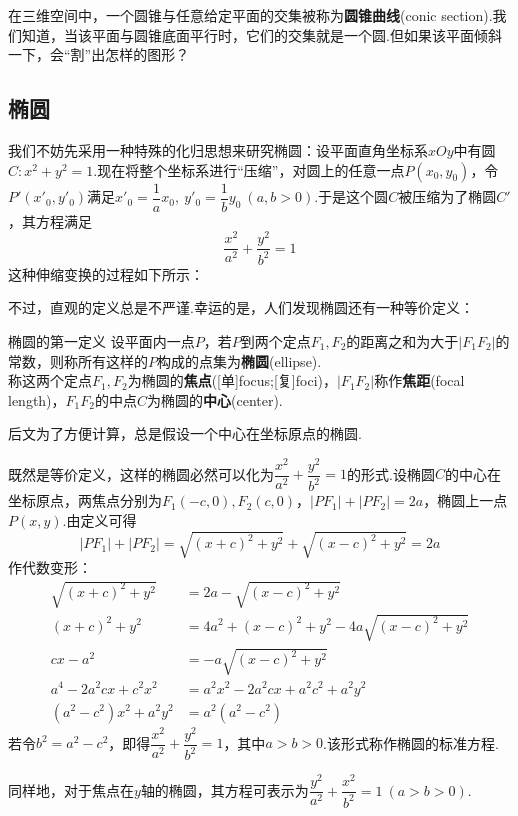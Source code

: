 \documentclass[lang=cn, zihao=5]{elegantbook}
\begin{document}
在三维空间中，一个圆锥与任意给定平面的交集被称为\textbf{圆锥曲线}(conic section).我们知道，当该平面与圆锥底面平行时，它们的交集就是一个圆.但如果该平面倾斜一下，会“割”出怎样的图形？

\subsection{椭圆}

我们不妨先采用一种特殊的化归思想来研究椭圆：设平面直角坐标系$xOy$中有圆$C:x^2+y^2=1$.现在将整个坐标系进行“压缩”，对圆上的任意一点$P(x_0,y_0)$，令$P'(x'_0,y'_0)$满足$x'_0=\dfrac{1}{a} x_0,~y'_0=\dfrac{1}{b} y_0~(a,b>0)$.于是这个圆$C$被压缩为了椭圆$C'$，其方程满足$$\frac{x^2}{a^2}+\frac{y^2}{b^2}=1$$
这种伸缩变换的过程如下所示：


不过，直观的定义总是不严谨.幸运的是，人们发现椭圆还有一种等价定义：

\begin{definition}{椭圆的第一定义}
	设平面内一点$P$，若$P$到两个定点$F_1,F_2$的距离之和为大于$|F_1F_2|$的常数，则称所有这样的$P$构成的点集为\textbf{椭圆}(ellipse). \\
	称这两个定点$F_1,F_2$为椭圆的\textbf{焦点}([单]focus;[复]foci)，$|F_1F_2|$称作\textbf{焦距}(focal length)，$F_1F_2$的中点$C$为椭圆的\textbf{中心}(center).
\end{definition}
\begin{remark}
	后文为了方便计算，总是假设一个中心在坐标原点的椭圆.
\end{remark}

既然是等价定义，这样的椭圆必然可以化为$\dfrac{x^2}{a^2}+\dfrac{y^2}{b^2}=1$的形式.设椭圆$C$的中心在坐标原点，两焦点分别为$F_1(-c,0),F_2(c,0)$，$|PF_1|+|PF_2|=2a$，椭圆上一点$P(x,y)$.由定义可得$$|PF_1|+|PF_2|=\sqrt{(x+c)^2+y^2} + \sqrt{(x-c)^2+y^2} = 2a$$
作代数变形：
\begin{align*}
	\sqrt{(x+c)^2+y^2} &= 2a - \sqrt{(x-c)^2+y^2} \\
	(x+c)^2+y^2 &= 4a^2 + (x-c)^2+y^2 - 4a\sqrt{(x-c)^2+y^2} \\
	cx-a^2 &= -a\sqrt{(x-c)^2+y^2} \\
	a^4 - 2a^2cx + c^2x^2 &= a^2x^2 - 2a^2cx + a^2c^2 + a^2y^2 \\
	(a^2-c^2)x^2+a^2y^2 &= a^2(a^2-c^2)
\end{align*}
若令$b^2=a^2-c^2$，即得$\dfrac{x^2}{a^2}+\dfrac{y^2}{b^2}=1$，其中$a>b>0$.该形式称作椭圆的标准方程.

同样地，对于焦点在$y$轴的椭圆，其方程可表示为$\dfrac{y^2}{a^2}+\dfrac{x^2}{b^2}=1~(a>b>0)$.
\end{document}
